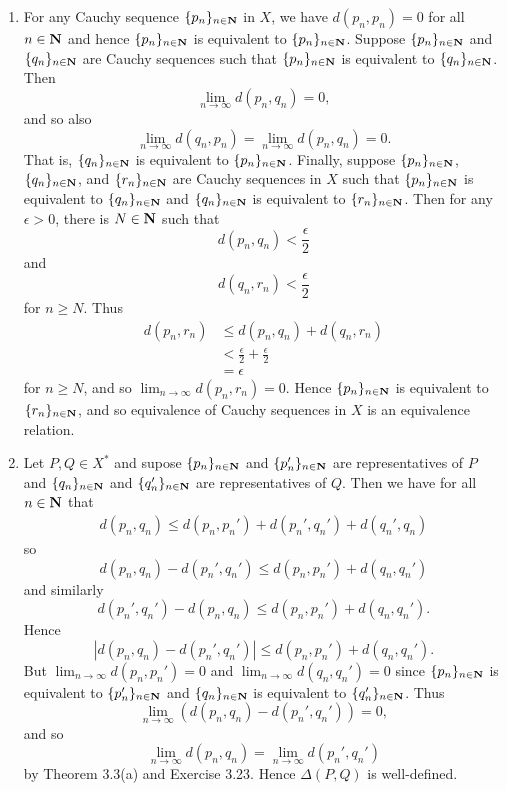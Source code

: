 \begin{ex}
\begin{enumerate}
\item For any Cauchy sequence $\{p_n\}_{n \in \mathbf{N}}$ in $X$, we have $d(p_n, p_n) = 0$ for all $n \in \mathbf{N}$ and hence $\{p_n\}_{n \in \mathbf{N}}$ is equivalent to $\{p_n\}_{n \in \mathbf{N}}$. Suppose $\{p_n\}_{n \in \mathbf{N}}$ and $\{q_n\}_{n \in \mathbf{N}}$ are Cauchy sequences such that $\{p_n\}_{n \in \mathbf{N}}$ is equivalent to $\{q_n\}_{n \in \mathbf{N}}$. Then \[\lim_{n\to\infty}d(p_n, q_n) = 0,\] and so also \[\lim_{n\to\infty}d(q_n, p_n) = \lim_{n\to\infty}d(p_n, q_n) = 0.\] That is, $\{q_n\}_{n \in \mathbf{N}}$ is equivalent to $\{p_n\}_{n \in \mathbf{N}}$. Finally, suppose $\{p_n\}_{n \in \mathbf{N}}$, $\{q_n\}_{n \in \mathbf{N}}$, and $\{r_n\}_{n \in \mathbf{N}}$ are Cauchy sequences in $X$ such that $\{p_n\}_{n \in \mathbf{N}}$ is equivalent to $\{q_n\}_{n \in \mathbf{N}}$ and $\{q_n\}_{n \in \mathbf{N}}$ is equivalent to $\{r_n\}_{n \in \mathbf{N}}$. Then for any $\epsilon > 0$, there is $N \in \mathbf{N}$ such that \[d(p_n, q_n) < \frac{\epsilon}{2}\] and \[d(q_n, r_n) < \frac{\epsilon}{2}\] for $n\geq N$. Thus
\begin{align*}
d(p_n, r_n) & \leq d(p_n, q_n) + d(q_n, r_n)\\
& < \frac{\epsilon}{2} + \frac{\epsilon}{2}\\
& = \epsilon
\end{align*}
for $n \geq N$, and so $\lim_{n\to\infty}d(p_n, r_n) = 0$. Hence $\{p_n\}_{n \in \mathbf{N}}$ is equivalent to $\{r_n\}_{n \in \mathbf{N}}$, and so equivalence of Cauchy sequences in $X$ is an equivalence relation.

\item Let $P, Q \in X^*$ and supose $\{p_n\}_{n \in \mathbf{N}}$ and $\{p_n'\}_{n \in \mathbf{N}}$ are representatives of $P$ and $\{q_n\}_{n \in \mathbf{N}}$ and $\{q_n'\}_{n \in \mathbf{N}}$ are representatives of $Q$. Then we have for all $n \in \mathbf{N}$ that
\begin{align*}
d(p_n, q_n) \leq d(p_n, p_n') + d(p_n', q_n') + d(q_n', q_n)
\end{align*}
so \[d(p_n, q_n) - d(p_n', q_n') \leq d(p_n, p_n') + d(q_n, q_n')\] and similarly \[d(p_n', q_n') - d(p_n, q_n) \leq d(p_n, p_n') + d(q_n, q_n').\] Hence \[|d(p_n, q_n) - d(p_n', q_n')| \leq d(p_n, p_n') + d(q_n, q_n').\] But $\lim_{n\to\infty}d(p_n, p_n') = 0$ and $\lim_{n\to\infty}d(q_n, q_n') = 0$ since $\{p_n\}_{n \in \mathbf{N}}$ is equivalent to $\{p_n'\}_{n \in \mathbf{N}}$ and $\{q_n\}_{n \in \mathbf{N}}$ is equivalent to $\{q_n'\}_{n \in \mathbf{N}}$. Thus \[\lim_{n\to\infty}(d(p_n, q_n) - d(p_n', q_n')) = 0,\] and so \[\lim_{n\to\infty}d(p_n, q_n) = \lim_{n\to\infty}d(p_n', q_n')\] by Theorem 3.3(a) and Exercise 3.23. Hence $\Delta(P, Q)$ is well-defined.


\end{enumerate}
\end{ex}

